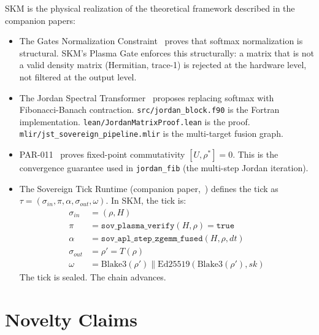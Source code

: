 \documentclass[11pt,a4paper]{article}
\begin{document}
SKM is the physical realization of the theoretical framework described
in the companion papers:

\begin{itemize}[noitemsep]
\item The Gates Normalization Constraint~\cite{parr2026gnc} proves that
  softmax normalization is structural. SKM's Plasma Gate enforces
  this structurally: a matrix that is not a valid density matrix
  (Hermitian, trace-1) is rejected at the hardware level, not
  filtered at the output level.

\item The Jordan Spectral Transformer~\cite{parr2026jordan} proposes
  replacing softmax with Fibonacci-Banach contraction.
  \texttt{src/jordan\_block.f90} is the Fortran implementation.
  \texttt{lean/JordanMatrixProof.lean} is the proof.
  \texttt{mlir/jst\_sovereign\_pipeline.mlir} is the multi-target
  fusion graph.

\item PAR-011~\cite{parr2026jacobian} proves fixed-point commutativity
  $[U, \rho^*] = 0$. This is the convergence guarantee used in
  \texttt{jordan\_fib} (the multi-step Jordan iteration).

\item The Sovereign Tick Runtime (companion paper,~\cite{parr2026unified})
  defines the tick as $\tau = (\sigma_{in}, \pi, \alpha, \sigma_{out},
  \omega)$. In SKM, the tick is:
  \begin{align*}
  \sigma_{in} &= (\rho, H) \\
  \pi &= \texttt{sov\_plasma\_verify}(H, \rho) = \texttt{true} \\
  \alpha &= \texttt{sov\_apl\_step\_zgemm\_fused}(H, \rho, dt) \\
  \sigma_{out} &= \rho' = T(\rho) \\
  \omega &= \text{Blake3}(\rho') \| \text{Ed25519}(\text{Blake3}(\rho'), sk)
  \end{align*}
  The tick is sealed. The chain advances.
\end{itemize}

\section{Novelty Claims}
\end{document}
